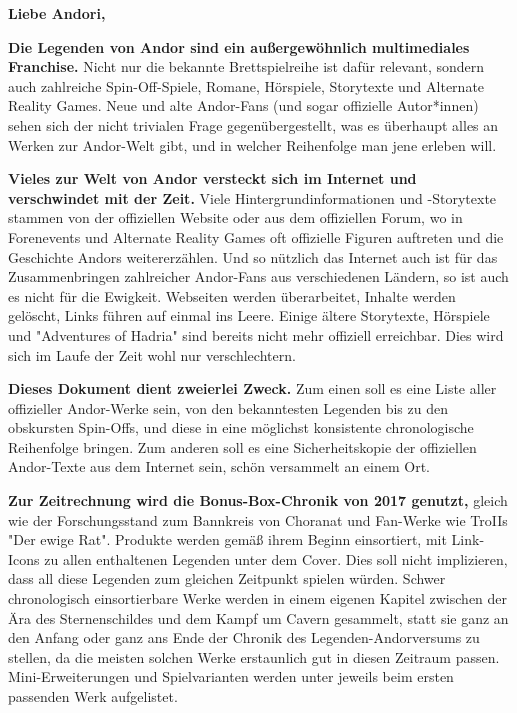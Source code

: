 \documentclass[10pt, a4paper, oneside]{book}
\begin{document}
\maketitle







\thispagestyle{plain}%


\setcounter{page}{3} %

\textbf{Liebe Andori,}

\begin{multicols}{2}

\textbf{Die Legenden von Andor sind ein außergewöhnlich multimediales Franchise.} Nicht nur die bekannte Brettspielreihe ist dafür relevant, sondern auch zahlreiche Spin-Off-Spiele, Romane, Hörspiele, Storytexte und Alternate Reality Games. Neue und alte Andor-Fans (und sogar offizielle Autor*innen) sehen sich der nicht trivialen Frage gegenübergestellt, was es überhaupt alles an Werken zur Andor-Welt gibt, und in welcher Reihenfolge man jene erleben will.\bigskip

\textbf{Vieles zur Welt von Andor versteckt sich im Internet und verschwindet mit der Zeit.} Viele Hintergrundinformationen und -Storytexte stammen von der offiziellen Website oder aus dem offiziellen Forum, wo in Forenevents und Alternate Reality Games oft offizielle Figuren auftreten und die Geschichte Andors weitererzählen. Und so nützlich das Internet auch ist für das Zusammenbringen zahlreicher Andor-Fans aus verschiedenen Ländern, so ist auch es nicht für die Ewigkeit. Webseiten werden überarbeitet, Inhalte werden gelöscht, Links führen auf einmal ins Leere. Einige ältere Storytexte, Hörspiele und "Adventures of Hadria" sind bereits nicht mehr offiziell erreichbar. Dies wird sich im Laufe der Zeit wohl nur verschlechtern.\bigskip

\textbf{Dieses Dokument dient zweierlei Zweck. } 
Zum einen soll es eine Liste aller offizieller Andor-Werke sein, von den bekanntesten Legenden bis zu den obskursten Spin-Offs, und diese in eine möglichst konsistente chronologische Reihenfolge bringen.
Zum anderen soll es eine Sicherheitskopie der offiziellen Andor-Texte aus dem Internet sein, schön versammelt an einem Ort.\bigskip

\textbf{Zur Zeitrechnung wird die Bonus-Box-Chronik von 2017 genutzt,} gleich wie der Forschungsstand zum Bannkreis von Choranat und Fan-Werke wie TroIIs "Der ewige Rat". Produkte werden gemäß ihrem Beginn einsortiert, mit Link-Icons zu allen enthaltenen Legenden unter dem Cover. Dies soll nicht implizieren, dass all diese Legenden zum gleichen Zeitpunkt spielen würden. Schwer chronologisch einsortierbare Werke werden in einem eigenen Kapitel zwischen der Ära des Sternenschildes und dem Kampf um Cavern gesammelt, statt sie ganz an den Anfang oder ganz ans Ende der Chronik des Legenden-Andorversums zu stellen, da die meisten solchen Werke erstaunlich gut in diesen Zeitraum passen. Mini-Erweiterungen und Spielvarianten werden unter jeweils beim ersten passenden Werk aufgelistet.\bigskip


\end{multicols}
\end{document}
